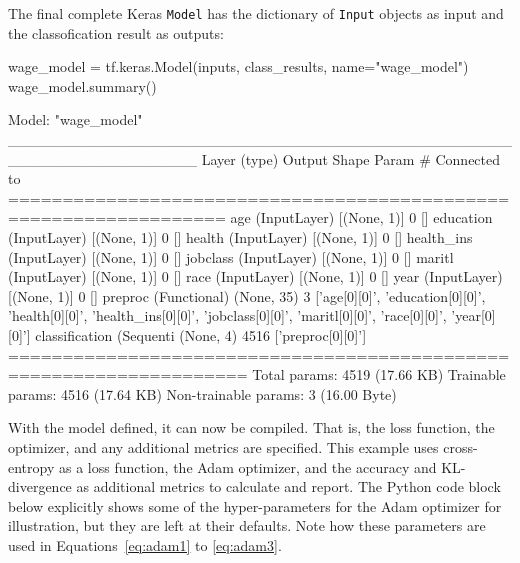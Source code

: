\begin{withcode}
The final complete Keras \texttt{Model} has the dictionary of \texttt{Input} objects as input and the classofication result as outputs:

\begin{pythoncode}
wage_model = tf.keras.Model(inputs, class_results, name="wage_model")
wage_model.summary()
\end{pythoncode}

\begin{textcode}
Model: "wage_model"
__________________________________________________________________
 Layer (type)             Output Shape  Param # Connected to                  
==================================================================
 age (InputLayer)         [(None, 1)]   0       []                            
 education (InputLayer)   [(None, 1)]   0       []                            
 health (InputLayer)      [(None, 1)]   0       []                            
 health_ins (InputLayer)  [(None, 1)]   0       []                            
 jobclass (InputLayer)    [(None, 1)]   0       []                            
 maritl (InputLayer)      [(None, 1)]   0       []                            
 race (InputLayer)        [(None, 1)]   0       []                            
 year (InputLayer)        [(None, 1)]   0       []                            
 preproc (Functional)     (None, 35)    3       ['age[0][0]',                 
                                                 'education[0][0]',           
                                                 'health[0][0]',              
                                                 'health_ins[0][0]',          
                                                 'jobclass[0][0]',            
                                                 'maritl[0][0]',              
                                                 'race[0][0]',                
                                                 'year[0][0]']                
 classification (Sequenti (None, 4)     4516    ['preproc[0][0]']           
====================================================================
Total params: 4519 (17.66 KB)
Trainable params: 4516 (17.64 KB)
Non-trainable params: 3 (16.00 Byte)
\end{textcode}

With the model defined, it can now be compiled. That is, the loss function, the optimizer, and any additional metrics are specified. This example uses cross-entropy as a loss function, the Adam optimizer, and the accuracy and KL-divergence as additional metrics to calculate and report. The Python code block below explicitly shows some of the hyper-parameters for the Adam optimizer for illustration, but they are left at their defaults. Note how these parameters are used in Equations~\ref{eq:adam1} to \ref{eq:adam3}.


\end{withcode}
